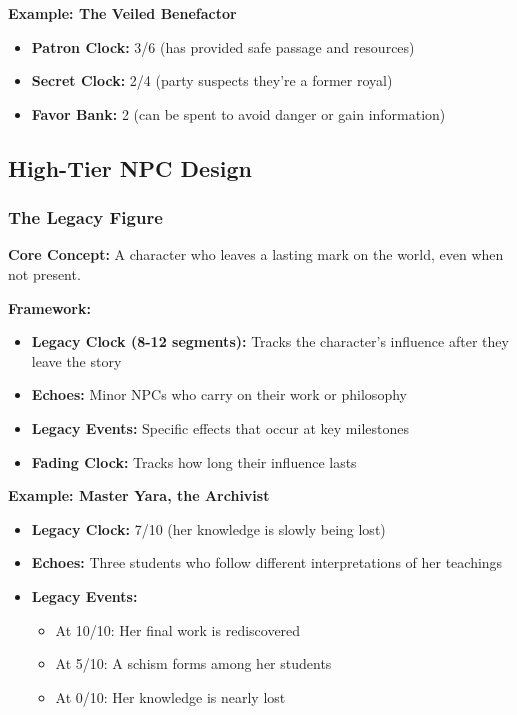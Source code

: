 \textbf{Example: The Veiled Benefactor}
\begin{itemize}
  \item \textbf{Patron Clock:} 3/6 (has provided safe passage and resources)
  \item \textbf{Secret Clock:} 2/4 (party suspects they're a former royal)
  \item \textbf{Favor Bank:} 2 (can be spent to avoid danger or gain information)
\end{itemize}

\subsection{High-Tier NPC Design}

\subsubsection{The Legacy Figure}

\textbf{Core Concept:} A character who leaves a lasting mark on the world, even when not present.

\textbf{Framework:}
\begin{itemize}
  \item \textbf{Legacy Clock (8-12 segments):} Tracks the character's influence after they leave the story
  \item \textbf{Echoes:} Minor NPCs who carry on their work or philosophy
  \item \textbf{Legacy Events:} Specific effects that occur at key milestones
  \item \textbf{Fading Clock:} Tracks how long their influence lasts
\end{itemize}

\textbf{Example: Master Yara, the Archivist}
\begin{itemize}
  \item \textbf{Legacy Clock:} 7/10 (her knowledge is slowly being lost)
  \item \textbf{Echoes:} Three students who follow different interpretations of her teachings
  \item \textbf{Legacy Events:}
    \begin{itemize}
      \item At 10/10: Her final work is rediscovered
      \item At 5/10: A schism forms among her students
      \item At 0/10: Her knowledge is nearly lost
    \end{itemize}
\end{itemize}

